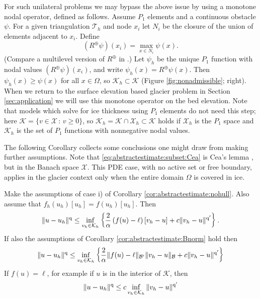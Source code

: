 \documentclass[hidelinks,onefignum,onetabnum,final]{siamart220329}  %
\newcommand{\cB}{\mathcal{B}}
\newcommand{\cK}{\mathcal{K}}
\newcommand{\cT}{\mathcal{T}}
\newcommand{\cX}{\mathcal{X}}
\newcommand{\qq}{{\text{\textnormal{q}}}}
\begin{document}
For such unilateral problems we may bypass the above issue by using a monotone nodal operator, defined as follows.  Assume $P_1$ elements and a continuous obstacle $\psi$.  For a given triangulation $\cT_h$ and node $x_i$ let $N_i$ be the closure of the union of elements adjacent to $x_i$.  Define
\begin{equation}
(R^{\oplus}\psi)(x_i) = \max_{x \in N_i} \psi(x). \label{eq:monotoneop}
\end{equation}
(Compare a multilevel version of $R^{\oplus}$ in \cite{BuelerFarrell2024}.)  Let $\psi_h$ be the unique $P_1$ function with nodal values $(R^{\oplus}\psi)(x_i)$, and write $\psi_h(x)=R^{\oplus} \psi(x)$.  Then $\psi_h(x)\ge \psi(x)$ for all $x\in \Omega$, so $\cK_h\subset \cK$ (Figure \ref{fig:nonadmissible}; right).  When we return to the surface elevation based glacier problem in Section \ref{sec:application} we will use this monotone operator on the bed elevation.  Note that models which solve for ice thickness using $P_1$ elements do not need this step; here $\cK = \{v\in\cX\,:\,v\ge 0\}$, so $\cK_h=\cK\cap\cX_h \subset \cK$ holds if $\cX_h$ is the $P_1$ space and $\cK_h$ is the set of $P_1$ functions with nonnegative nodal values.

The following Corollary collects some conclusions one might draw from making further assumptions.  Note that \eqref{eq:abstractestimate:subset:Cea} is Cea's lemma \cite[Theorem 2.4.1]{Ciarlet2002}, but in the Banach space $\cX$.  This PDE case, with no active set or free boundary, applies in the glacier context only when the entire domain $\Omega$ is covered in ice.

\begin{corollary}  \label{cor:abstractestimate:various}  Make the assumptions of case i) of Corollary \ref{cor:abstractestimate:nohull}.  Also assume that $f_h(u_h)[u_h] = f(u_h)[u_h]$.  Then
\begin{equation}
\|u-u_h\|^\qq \le  \inf_{v_h\in\cK_h} \left\{\frac{2}{\alpha} \left(f(u)-\ell\right)[v_h-u] + c \|v_h - u\|^{\qq'}\right\}. \label{eq:abstractestimate:subset}
\end{equation}
If also the assumptions of Corollary \ref{cor:abstractestimate:Bnorm} hold then
\begin{equation}
\|u-u_h\|^\qq \le \inf_{v_h\in\cK_h} \left\{\frac{2}{\alpha} \|f(u)-\ell\|_{\cB'} \|v_h-u\|_{\cB} + c \|v_h-u\|^{\qq'}\right\} \label{eq:abstractestimate:subset:Bnorm}
\end{equation}
If $f(u)=\ell$, for example if $u$ is in the interior of $\cK$, then
\begin{equation}
\|u-u_h\|^\qq \le c \inf_{v_h\in\cK_h} \|v_h-u\|^{\qq'} \label{eq:abstractestimate:subset:Cea}
\end{equation}
\end{corollary}
\end{document}
